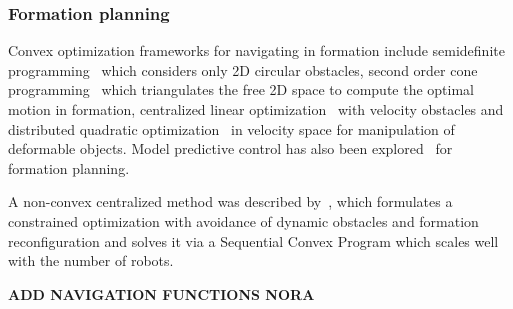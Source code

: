 \subsubsection{Formation planning}
Convex optimization frameworks for navigating in formation include semidefinite programming~\cite{Derenick:2010cc} which considers only 2D circular obstacles, second order cone programming~\cite{Derenick:ha} which triangulates the free 2D space to compute the optimal motion in formation, centralized linear optimization~\cite{guy2015} with velocity obstacles and distributed quadratic optimization~\cite{AlonsoMora:2015wi} in velocity space for manipulation of deformable objects. Model predictive control has also been explored~\cite{Dunbar:2002fh} for formation planning.

A non-convex centralized method was described by~\cite{AlonsoMora:2015iros}, which formulates a constrained optimization with avoidance of dynamic obstacles and formation reconfiguration and solves it via a Sequential Convex Program which scales well with the number of robots.

\textbf{ADD NAVIGATION FUNCTIONS NORA}










